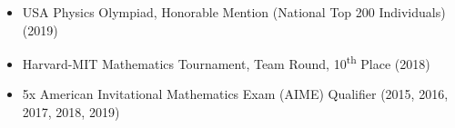 \documentclass[letterpaper,11pt]{article}
\newcommand{\myitem}[1]{\item #1 \vspace{-8pt}}
\newcommand{\mysubitem}[1]{\item #1 \vspace{-4pt}}
\begin{document}
\begin{itemize}[leftmargin=*]
	\myitem{USA Physics Olympiad, Honorable Mention (National Top 200 Individuals) (2019)}
	\myitem {Harvard-MIT Mathematics Tournament, Team Round, 10\textsuperscript{th} Place (2018)}
	\myitem {5x American Invitational Mathematics Exam (AIME) Qualifier (2015, 2016, 2017, 2018, 2019)}
		
			

\end{itemize}
\end{document}
